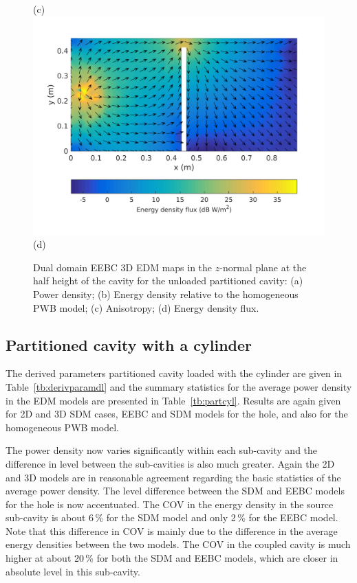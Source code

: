 \documentclass[a4paper]{article}
\numberwithin{equation}{section}
\newcounter{Table}
\begin{document}
\begin{figure}[hp]
\begin{center}
{\footnotesize (c)}\\
\vspace{2mm}
\includegraphics[trim={0 8mm 0 12mm},clip,width=0.52\linewidth]{figures/DDM-EEBC_3D_DU_EnergyDensityFluxMap}\\
{\footnotesize (d)}\\
\vspace{-2mm}
\caption{\label{fg:partemptyddm_maps} Dual domain EEBC 3D EDM maps in the $z$-normal plane at the half height of the cavity for the 
unloaded partitioned cavity: (a) Power density; (b) Energy density relative to the homogeneous PWB model;
(c) Anisotropy; (d) Energy density flux.}
\end{center}
\end{figure}

\subsection[Partitioned cavity with a cylinder]{Partitioned cavity with a cylinder}
\label{sc:res:cylpart}

The derived parameters partitioned cavity loaded with the cylinder are given in Table~\ref{tb:derivparamdl} 
and the summary statistics for the average power density in the EDM models are presented in Table~\ref{tb:partcyl}. 
Results are again given for 2D and 3D SDM cases, EEBC and SDM models for the hole, and also for the homogeneous 
PWB model. 

The power density now varies significantly within each sub-cavity and the difference in level between the sub-cavities is
also much greater. Again the 2D and 3D models are in reasonable agreement regarding the basic statistics of the 
average power density. The level difference between the SDM and EEBC models for the hole is now accentuated. 
The COV in the energy density in the source sub-cavity is about 6\,\% for the SDM model and only 2\,\% for the EEBC model.
Note that this difference in COV is mainly due to the difference in the average energy densities between the two
models. The COV in the coupled cavity is much higher at about 20\,\% for both the SDM and EEBC models, which are
closer in absolute level in this sub-cavity.
\end{document}
